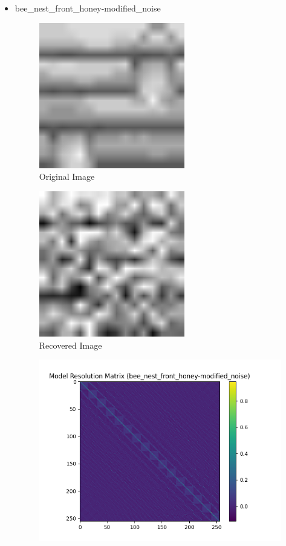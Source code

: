 \documentclass{article}
\begin{document}
\begin{itemize}
        \item bee\_nest\_front\_honey-modified\_noise
    \begin{figure}[h]
        \centering
        \includegraphics[width=0.6\textwidth]{images/greyscale/bee_nest_front_honey-modified.png}
        \caption{Original Image}
    \end{figure}
    \begin{figure}[h]
        \centering
        \includegraphics[width=0.6\textwidth]{images/outputs/noise/bee_nest_front_honey-modified_noise.png}
        \caption{Recovered Image}
    \end{figure}
    \begin{figure}[h]
        \centering
        \includegraphics[width=1\textwidth]{images/outputs/modelres/bee_nest_front_honey-modified_noise.png}

\end{figure}
\end{itemize}
\end{document}
